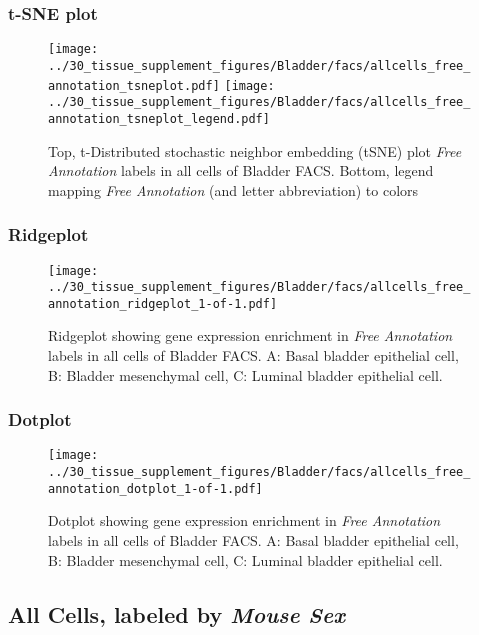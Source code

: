 \clearpage
\subsubsection{t-SNE plot}
\begin{figure}[h]
\centering
\texttt{[image: ../30\_tissue\_supplement\_figures/Bladder/facs/allcells\_free\_annotation\_tsneplot.pdf]}
\texttt{[image: ../30\_tissue\_supplement\_figures/Bladder/facs/allcells\_free\_annotation\_tsneplot\_legend.pdf]}
\caption{Top, t-Distributed stochastic neighbor embedding (tSNE) plot  \emph{Free Annotation} labels in all cells of Bladder FACS. Bottom, legend mapping \emph{Free Annotation} (and letter abbreviation) to colors}
\end{figure}


\clearpage

\subsubsection{Ridgeplot}
\begin{figure}[h]
\centering
\texttt{[image: ../30\_tissue\_supplement\_figures/Bladder/facs/allcells\_free\_annotation\_ridgeplot\_1-of-1.pdf]}

\caption{ Ridgeplot  showing gene expression enrichment in \emph{Free Annotation} labels in all cells of Bladder FACS. A: Basal bladder epithelial cell, B: Bladder mesenchymal cell, C: Luminal bladder epithelial cell.}
\end{figure}


\clearpage

\subsubsection{Dotplot}
\begin{figure}[h]
\centering
\texttt{[image: ../30\_tissue\_supplement\_figures/Bladder/facs/allcells\_free\_annotation\_dotplot\_1-of-1.pdf]}

\caption{ Dotplot  showing gene expression enrichment in \emph{Free Annotation} labels in all cells of Bladder FACS. A: Basal bladder epithelial cell, B: Bladder mesenchymal cell, C: Luminal bladder epithelial cell.}
\end{figure}


\clearpage

\subsection{All Cells, labeled by \emph{Mouse Sex}}
